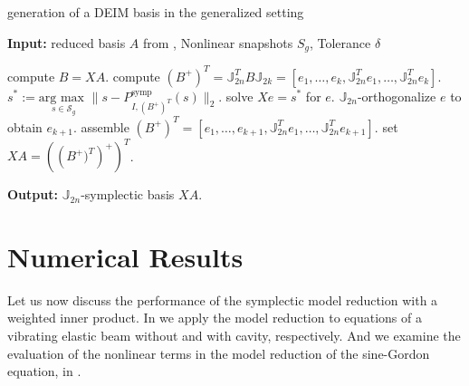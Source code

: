 \begin{algorithm} 
	\caption{generation of a DEIM basis in the generalized setting} \label{alg:5.2}
	\textbf{Input:} reduced basis $A$ from , Nonlinear snapshots $S_g$, Tolerance $\delta$
	\begin{algorithmic} [1]
		\State compute $B=XA$.
		\State compute $(B^+)^T = \mathbb J_{2n}^T B \mathbb J_{2k} = [e_1,\dots ,e_{k} , \mathbb J_{2n}^Te_1,\dots, \mathbb J_{2n}^Te_{k}]$.
			\State $s^* := \underset{s\in \mathcal S_g}{\text{arg\ max }} \| s - P_{I,(B^+)^T}^{\text{symp}} (s)  \|_2$.
			\State solve $Xe = s^*$ for $e$.
			\State $\mathbb J_{2n}$-orthogonalize $e$ to obtain $e_{k+1}$.
			\State assemble $(B^+)^T = [e_1,\dots ,e_{k+1} , \mathbb J_{2n}^Te_1,\dots, \mathbb J_{2n}^Te_{k+1}]$.
		\EndWhile
		\State set $XA = \left( \left (B^+)^T \right)^+ \right)^T$.
	\end{algorithmic}
	\vspace{0.5cm}
	\textbf{Output:} $\mathbb J_{2n}$-symplectic basis $XA$.
\end{algorithm}









\section{Numerical Results} \label{sec:res}
Let us now discuss the performance of the symplectic model reduction with a weighted inner product. In  we apply the model reduction to equations of a vibrating elastic beam without and with cavity, respectively. And we examine the evaluation of the nonlinear terms in the model reduction of the sine-Gordon equation, in .

